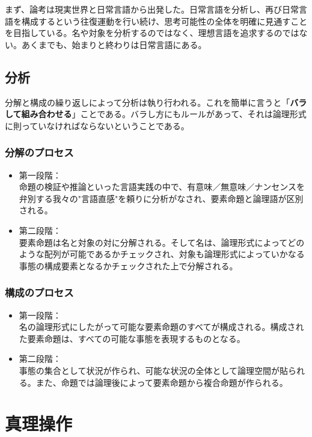 \documentclass[12pt,a4paper,onecolumn,openany,article]{jsarticle}
\begin{document}
まず、論考は現実世界と日常言語から出発した。日常言語を分析し、再び日常言語を構成するという往復運動を行い続け、思考可能性の全体を明確に見通すことを目指している。名や対象を分析するのではなく、理想言語を追求するのではない。あくまでも、始まりと終わりは日常言語にある。

\subsection{分析}

分解と構成の繰り返しによって分析は執り行われる。これを簡単に言うと「{\bf{バラして組み合わせる}}」ことである。バラし方にもルールがあって、それは論理形式に則っていなければならないということである。

\subsubsection{分解のプロセス}

\begin{itemize}

\item 第一段階：\\命題の検証や推論といった言語実践の中で、有意味／無意味／ナンセンスを弁別する我々の"言語直感"を頼りに分析がなされ、要素命題と論理語が区別される。

\item 第二段階：\\要素命題は名と対象の対に分解される。そして名は、論理形式によってどのような配列が可能であるかチェックされ、対象も論理形式によっていかなる事態の構成要素となるかチェックされた上で分解される。

\end{itemize}

\subsubsection{構成のプロセス}

\begin{itemize}
\item 第一段階：\\ 名の論理形式にしたがって可能な要素命題のすべてが構成される。構成された要素命題は、すべての可能な事態を表現するものとなる。
\item 第二段階：\\ 事態の集合として状況が作られ、可能な状況の全体として論理空間が貼られる。また、命題では論理後によって要素命題から複合命題が作られる。

\end{itemize}

\section{真理操作}
\end{document}
